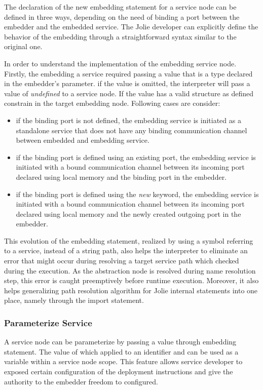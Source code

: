 The declaration of the new embedding statement for a service node can be defined in three ways, depending on the need of binding a port between the embedder and the embedded service. The Jolie developer can explicitly define the behavior of the embedding through a straightforward syntax similar to the original one.

In order to understand the implementation of the embedding service node. Firstly, the embedding a service required passing a value that is a type declared in the embedder's parameter. if the value is omitted, the interpreter will pass a value of \textit{undefined} to a service node. If the value has a valid structure as defined constrain in the target embedding node. Following cases are consider:

\begin{itemize}
    \item if the binding port is not defined, the embedding service is initiated as a standalone service that does not have any binding communication channel between embedded and embedding service.
    \item if the binding port is defined using an existing port, the embedding service is initiated with a bound communication channel between its incoming port declared using local memory and the binding port in the embedder.
    \item if the binding port is defined using the \textit{new} keyword, the embedding service is initiated with a bound communication channel between its incoming port declared using local memory and the newly created outgoing port in the embedder.
\end{itemize}

This evolution of the embedding statement, realized by using a symbol referring to a service, instead of a string path, also helps the interpreter to eliminate an error that might occur during resolving a target service path which checked during the execution. As the abstraction node is resolved during name resolution step, this error is caught preemptively before runtime execution. Moreover, it also helps generalizing path resolution algorithm for Jolie internal statements into one place, namely through the import statement.

\subsubsection{Parameterize Service}

A service node can be parameterize by passing a value through embedding statement. The value of which applied to an identifier and can be used as a variable within a service node scope. This feature allows service developer to exposed certain configuration of the deployment instructions and give the authority to the embedder freedom to configured.

